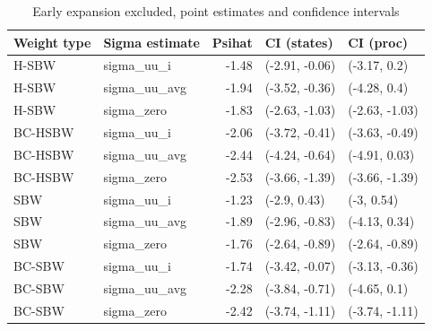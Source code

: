 \documentclass[12pt]{article}
\begin{document}
\begin{table}[ht]
\centering
\begin{tabular}{llrll}
  \toprule
Weight type & Sigma estimate & Psihat & CI (states) & CI (proc) \\ 
  \midrule
H-SBW & sigma\_uu\_i & -1.48 & (-2.91, -0.06) & (-3.17, 0.2) \\ 
  H-SBW & sigma\_uu\_avg & -1.94 & (-3.52, -0.36) & (-4.28, 0.4) \\ 
  H-SBW & sigma\_zero & -1.83 & (-2.63, -1.03) & (-2.63, -1.03) \\ 
  BC-HSBW & sigma\_uu\_i & -2.06 & (-3.72, -0.41) & (-3.63, -0.49) \\ 
  BC-HSBW & sigma\_uu\_avg & -2.44 & (-4.24, -0.64) & (-4.91, 0.03) \\ 
  BC-HSBW & sigma\_zero & -2.53 & (-3.66, -1.39) & (-3.66, -1.39) \\ 
  SBW & sigma\_uu\_i & -1.23 & (-2.9, 0.43) & (-3, 0.54) \\ 
  SBW & sigma\_uu\_avg & -1.89 & (-2.96, -0.83) & (-4.13, 0.34) \\ 
  SBW & sigma\_zero & -1.76 & (-2.64, -0.89) & (-2.64, -0.89) \\ 
  BC-SBW & sigma\_uu\_i & -1.74 & (-3.42, -0.07) & (-3.13, -0.36) \\ 
  BC-SBW & sigma\_uu\_avg & -2.28 & (-3.84, -0.71) & (-4.65, 0.1) \\ 
  BC-SBW & sigma\_zero & -2.42 & (-3.74, -1.11) & (-3.74, -1.11) \\ 
   \bottomrule
\end{tabular}
\caption{Early expansion excluded, point estimates and confidence intervals}
\label{tab:confintmainc2}
\end{table}
\end{document}
